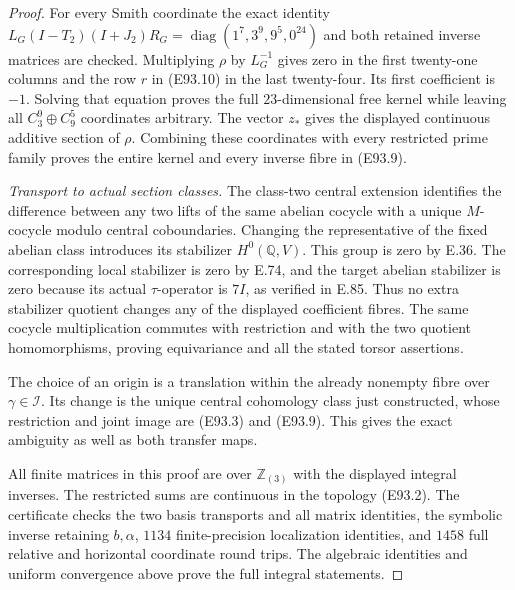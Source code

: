 \begin{proof}
For every Smith coordinate the exact identity
$L_G(I-T_2)(I+J_2)R_G
  =\operatorname{diag}(1^7,3^9,9^5,0^{24})$
and both retained inverse matrices are checked.
Multiplying $\rho$ by $L_G^{-1}$ gives zero in
the first twenty-one columns and the row $r$
in (E93.10) in the last twenty-four. Its first
coefficient is $-1$. Solving that equation proves
the full $23$-dimensional free kernel while leaving
all $C_3^9\oplus C_9^5$ coordinates arbitrary.
The vector $z_*$ gives the displayed continuous
additive section of $\rho$. Combining these
coordinates with every restricted prime family
proves the entire kernel and every inverse fibre
in (E93.9).

\emph{Transport to actual section classes.}
The class-two central extension identifies the
difference between any two lifts of the same
abelian cocycle with a unique $M$-cocycle modulo
central coboundaries. Changing the representative
of the fixed abelian class introduces its
stabilizer $H^0(\mathbb Q,V)$. This group is zero
by E.36. The corresponding local stabilizer is
zero by E.74, and the target abelian stabilizer
is zero because its actual $\tau$-operator is
$7I$, as verified in E.85. Thus no extra
stabilizer quotient changes any of the displayed
coefficient fibres. The same cocycle multiplication
commutes with restriction and with the two
quotient homomorphisms, proving equivariance
and all the stated torsor assertions.

The choice of an origin is a translation within
the already nonempty fibre over $\gamma\in\mathcal I$.
Its change is the unique central cohomology
class just constructed, whose restriction and
joint image are (E93.3) and (E93.9). This gives
the exact ambiguity as well as both transfer maps.

All finite matrices in this proof are over
$\mathbb Z_{(3)}$ with the displayed integral
inverses. The restricted sums are continuous in
the topology (E93.2). The certificate checks the
two basis transports and all matrix identities,
the symbolic inverse retaining $b,\alpha$, $1134$
finite-precision localization identities, and
$1458$ full relative and horizontal coordinate
round trips. The algebraic identities and uniform
convergence above prove the full integral statements.
\end{proof}
